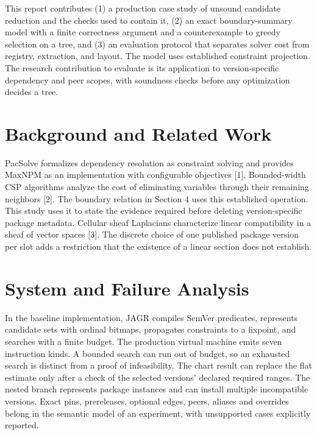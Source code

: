 \documentclass[
  11pt,
  letterpaper,
]{article}
\begin{document}
This report contributes (1) a production case study of unsound candidate
reduction and the checks used to contain it, (2) an exact
boundary-summary model with a finite correctness argument and a
counterexample to greedy selection on a tree, and (3) an evaluation
protocol that separates solver cost from registry, extraction, and
layout. The model uses established constraint projection. The research
contribution to evaluate is its application to version-specific
dependency and peer scopes, with soundness checks before any
optimization decides a tree.

\section{Background and Related Work}\label{background-and-related-work}

PacSolve formalizes dependency resolution as constraint solving and
provides MaxNPM as an implementation with configurable objectives
{[}1{]}. Bounded-width CSP algorithms analyze the cost of eliminating
variables through their remaining neighbors {[}2{]}. The boundary
relation in Section 4 uses this established operation. This study uses
it to state the evidence required before deleting version-specific
package metadata. Cellular sheaf Laplacians characterize linear
compatibility in a sheaf of vector spaces {[}3{]}. The discrete choice
of one published package version per slot adds a restriction that the
existence of a linear section does not establish.

\section{System and Failure Analysis}\label{system-and-failure-analysis}

In the baseline implementation, JAGR compiles SemVer predicates,
represents candidate sets with ordinal bitmaps, propagates constraints
to a fixpoint, and searches with a finite budget. The production virtual
machine emits seven instruction kinds. A bounded search can run out of
budget, so an exhausted search is distinct from a proof of
infeasibility. The chart result can replace the flat estimate only after
a check of the selected versions' declared required ranges. The nested
branch represents package instances and can install multiple
incompatible versions. Exact pins, prereleases, optional edges, peers,
aliases and overrides belong in the semantic model of an experiment,
with unsupported cases explicitly reported.
\end{document}
